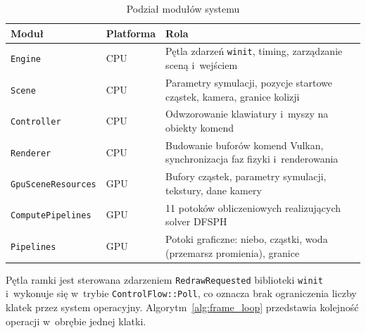 \begin{table}[htbp]
\centering
\caption{Podział modułów systemu}
\label{tab:subsystems}
\begin{tabular}{lp{2.5cm}p{7cm}}
\toprule
\textbf{Moduł} & \textbf{Platforma} & \textbf{Rola} \\
\midrule
\texttt{Engine}            & CPU          & Pętla zdarzeń \texttt{winit}, timing, zarządzanie sceną i~wejściem \\[3pt]
\texttt{Scene}             & CPU          & Parametry symulacji, pozycje startowe cząstek, kamera, granice kolizji \\[3pt]
\texttt{Controller}        & CPU          & Odwzorowanie klawiatury i~myszy na obiekty komend \\[3pt]
\texttt{Renderer}          & CPU          & Budowanie buforów komend Vulkan, synchronizacja faz fizyki i~renderowania \\[3pt]
\texttt{GpuSceneResources} & GPU          & Bufory cząstek, parametry symulacji, tekstury, dane kamery \\[3pt]
\texttt{ComputePipelines}  & GPU          & 11 potoków obliczeniowych realizujących solver DFSPH \\[3pt]
\texttt{Pipelines}         & GPU          & Potoki graficzne: niebo, cząstki, woda (przemarsz promienia), granice \\
\bottomrule
\end{tabular}
\end{table}

Pętla ramki jest sterowana zdarzeniem \texttt{RedrawRequested} biblioteki
\texttt{winit} i~wykonuje się w~trybie \texttt{ControlFlow::Poll}, co oznacza brak
ograniczenia liczby klatek przez system operacyjny. Algorytm~\ref{alg:frame_loop}
przedstawia kolejność operacji w~obrębie jednej klatki.

